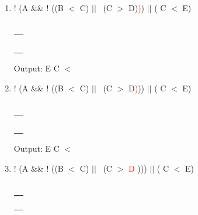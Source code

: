 \documentclass[a4paper]{article}
\begin{document}
\begin{large}
\begin{enumerate}
    \item
          ! (A \&\& ! ((B $<$ C) $||$ \ (C $>$ D)\textcolor{red}{)}) $||$ ( C $<$ E)\\
          \\
          \begin{tabular}[t]{ | p{1.6em} | }
            \makecell{ }      \\ \hline
            \makecell{}       \\ \hline
            \makecell{}       \\ \hline
            \makecell{)}      \\ \hline
            \makecell{)}      \\ \hline
            \makecell{ $||$ } \\ \hline
          \end{tabular}
          \hspace{2em}
          Output: E C $<$
    \item
          ! (A \&\& ! ((B $<$ C) $||$ \ (C $>$ D\textcolor{red}{)})) $||$ ( C $<$ E)\\
          \\
          \begin{tabular}[t]{ | p{1.6em} | }
            \makecell{ }      \\ \hline
            \makecell{}       \\ \hline
            \makecell{)}      \\ \hline
            \makecell{)}      \\ \hline
            \makecell{)}      \\ \hline
            \makecell{ $||$ } \\ \hline
          \end{tabular}
          \hspace{2em}
          Output: E C $<$
    \item
          ! (A \&\& ! ((B $<$ C) $||$ \ (C $>$ \textcolor{red}{D} ))) $||$ ( C $<$ E)\\
          \\
          \begin{tabular}[t]{ | p{1.6em} | }
            \makecell{ }      \\ \hline
            \makecell{}       \\ \hline
            \makecell{)}      \\ \hline
            \makecell{)}      \\ \hline
            \makecell{)}      \\ \hline

\end{tabular}
\end{enumerate}
\end{large}
\end{document}
